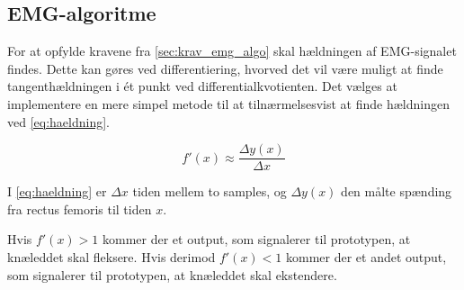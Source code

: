 \subsection{EMG-algoritme}
For at opfylde kravene fra \autoref{sec:krav_emg_algo} skal hældningen af EMG-signalet findes. Dette kan gøres ved differentiering, hvorved det vil være muligt at finde tangenthældningen i ét punkt ved differentialkvotienten. Det vælges at implementere en mere simpel metode til at tilnærmelsesvist at finde hældningen ved \autoref{eq:haeldning}.

\begin{equation}
f'(x)\approx\dfrac{\Delta y(x)}{\Delta x}
\label{eq:haeldning}
\end{equation}

\noindent
I \autoref{eq:haeldning} er $\Delta x$ tiden mellem to samples, og $\Delta y(x)$ den målte spænding fra rectus femoris til tiden $x$. 

Hvis $f'(x)>1$ kommer der et output, som signalerer til prototypen, at knæleddet skal fleksere. Hvis derimod $f'(x)<1$ kommer der et andet output, som signalerer til prototypen, at knæleddet skal ekstendere.